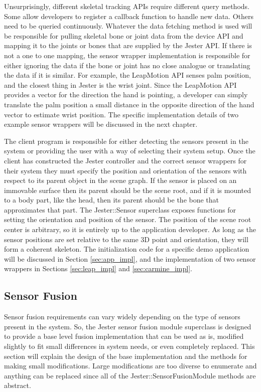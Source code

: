 Unsurprisingly, different skeletal tracking APIs require different query methods. Some allow developers to register a callback function to handle new data. Others need to be queried continuously. Whatever the data fetching method is used will be responsible for pulling skeletal bone or joint data from the device API and mapping it to the joints or bones that are supplied by the Jester API. If there is not a one to one mapping, the sensor wrapper implementation is responsible for either ignoring the data if the bone or joint has no close analogue or translating the data if it is similar. For example, the LeapMotion API senses palm position, and the closest thing in Jester is the wrist joint. Since the LeapMotion API provides a vector for the direction the hand is pointing, a developer can simply translate the palm position a small distance in the opposite direction of the hand vector to estimate wrist position. The specific implementation details of two example sensor wrappers will be discussed in the next chapter.

The client program is responsible for either detecting the sensors present in the system or providing the user with a way of selecting their system setup. Once the client has constructed the Jester controller and the correct sensor wrappers for their system they must specify the position and orientation of the sensors with respect to its parent object in the scene graph. If the sensor is placed on an immovable surface then its parent should be the scene root, and if it is mounted to a body part, like the head, then its parent should be the bone that approximates that part. The Jester::Sensor superclass exposes functions for setting the orientation and position of the sensor. The position of the scene root center is arbitrary, so it is entirely up to the application developer. As long as the sensor positions are set relative to the same 3D point and orientation, they will form a coherent skeleton. The initialization code for a specific demo application will be discussed in Section \ref{sec:app_impl}, and the implementation of two sensor wrappers in Sections \ref{sec:leap_impl} and \ref{sec:carmine_impl}.
	
\subsection{Sensor Fusion}\label{sec:fuser_des_impl}

Sensor fusion requirements can vary widely depending on the type of sensors present in the system. So, the Jester sensor fusion module superclass is designed to provide a base level fusion implementation that can be used as is, modified slightly to fit small differences in system needs, or even completely replaced. This section will explain the design of the base implementation and the methods for making small modifications. Large modifications are too diverse to enumerate and anything can be replaced since all of the Jester::SensorFusionModule methods are abstract.

